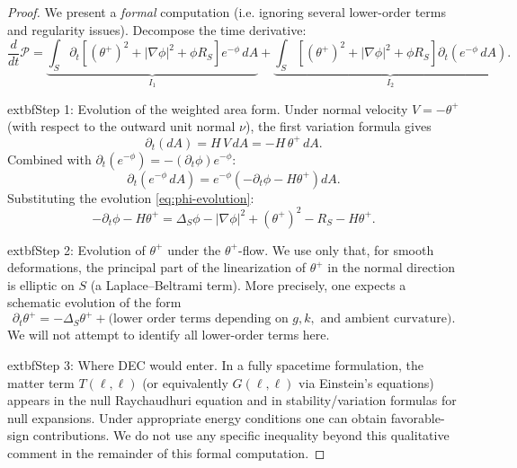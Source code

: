 \begin{proof}
We present a \emph{formal} computation (i.e. ignoring several lower-order terms and regularity issues). Decompose the time derivative:
\begin{equation}
\frac{d}{dt}\mathcal{P} = \underbrace{\int_S \partial_t\left[(\theta^+)^2 + |\nabla\phi|^2 + \phi R_S\right]e^{-\phi} \, dA}_{I_1} + \underbrace{\int_S \left[(\theta^+)^2 + |\nabla\phi|^2 + \phi R_S\right]\partial_t(e^{-\phi} \, dA)}_{I_2}.
\end{equation}

	extbf{Step 1: Evolution of the weighted area form.}
Under normal velocity $V = -\theta^+$ (with respect to the outward unit normal $\nu$), the first variation formula gives
\begin{equation}
\partial_t(dA) = H\,V\, dA = -H\,\theta^+\, dA.
\end{equation}
Combined with $\partial_t(e^{-\phi}) = -(\partial_t\phi)e^{-\phi}$:
\begin{equation}
\partial_t(e^{-\phi} \, dA) = e^{-\phi}\left(-\partial_t\phi - H\theta^+\right)dA.
\end{equation}
Substituting the evolution \eqref{eq:phi-evolution}:
\begin{equation}
-\partial_t\phi - H\theta^+ = \Delta_S\phi - |\nabla\phi|^2 + (\theta^+)^2 - R_S - H\theta^+.
\end{equation}

	extbf{Step 2: Evolution of $\theta^+$ under the $\theta^+$-flow.}
We use only that, for smooth deformations, the principal part of the linearization of $\theta^+$ in the normal direction is elliptic on $S$ (a Laplace--Beltrami term). More precisely, one expects a schematic evolution of the form
\begin{equation}
\partial_t\theta^+ = -\Delta_S\theta^+ + \text{(lower order terms depending on } g,k,\text{ and ambient curvature)}.
\label{eq:theta-evolution-schematic}
\end{equation}
We will not attempt to identify all lower-order terms here.

	extbf{Step 3: Where DEC would enter.}
In a fully spacetime formulation, the matter term $T(\ell,\ell)$ (or equivalently $G(\ell,\ell)$ via Einstein's equations) appears in the null Raychaudhuri equation and in stability/variation formulas for null expansions. Under appropriate energy conditions one can obtain favorable-sign contributions. We do not use any specific inequality beyond this qualitative comment in the remainder of this formal computation.


\end{proof}
